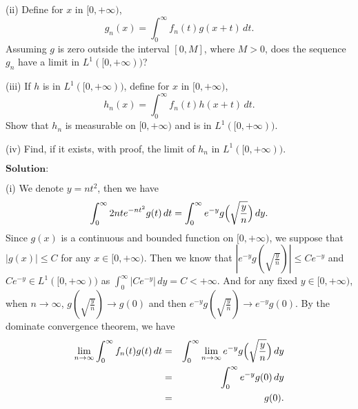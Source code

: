 \documentclass[12pt,a4paper]{ctexart}
\begin{document}
(ii) Define for $x$ in $[0, + \infty)$,
\begin{equation*}
   g_{n}(x) = \int_{0}^{\infty} f_{n} (t) g(x + t) \, d t.
\end{equation*}
Assuming $g$ is zero outside the interval $[0, M]$, where $M > 0$, does the sequence $g_{n}$ have a limit in $L^{1}([0, + \infty))$?

(iii) If $h$ is in $L^{1}([0, + \infty))$, define for $x$ in $[0, + \infty)$,
\begin{equation*}
   h_{n}(x) = \int_{0}^{\infty} f_{n} (t) h(x + t) \, d t.
\end{equation*}
Show that $h_{n}$ is measurable on $[0, + \infty)$ and is in $L^{1} ([0, + \infty))$.

(iv) Find, if it exists, with proof, the limit of $h_{n}$ in $L^{1} ([0, + \infty))$.


\vspace{8pt}
$\textbf{Solution:}$

(i) We denote $y = n t^{2}$, then we have
\begin{equation*}
    \int_{0}^{\infty} 2 n t e^{- n t^{2}} g(t) \, d t = \int_{0}^{\infty} e^{-y} g \Big{(} \sqrt{\frac{y}{n}} \Big{)} \, d y.
\end{equation*}
Since $g(x)$ is a continuous and bounded function on $[0, + \infty)$, we suppose that $| g(x) | \leq C$ for any $x \in [0, + \infty)$. Then we know that $| e^{-y} g(\sqrt{\frac{y}{n}}) | \leq C e^{-y}$ and $C e^{-y} \in L^{1}([0, + \infty))$ as $\int_{0}^{\infty} | C e^{-y}| \, d y = C < + \infty$. And for any fixed $y \in [0, + \infty)$, when $n \to \infty$, $g(\sqrt{\frac{y}{n}}) \to g(0)$ and then $e^{-y} g(\sqrt{\frac{y}{n}}) \to e^{-y} g(0)$. By the dominate convergence theorem, we have
\begin{eqnarray*}
\lim_{n \to \infty} \int_{0}^{\infty} f_{n}(t) g(t) \, d t & = &  \int_{0}^{\infty} \lim_{n \to \infty} e^{-y} g \Big{(} \sqrt{\frac{y}{n}} \Big{)} \, d y \\
& = &  \int_{0}^{\infty} e^{-y} g(0) \, d y  \\
& = & g(0).
\end{eqnarray*}

\vspace{4pt}
\end{document}
